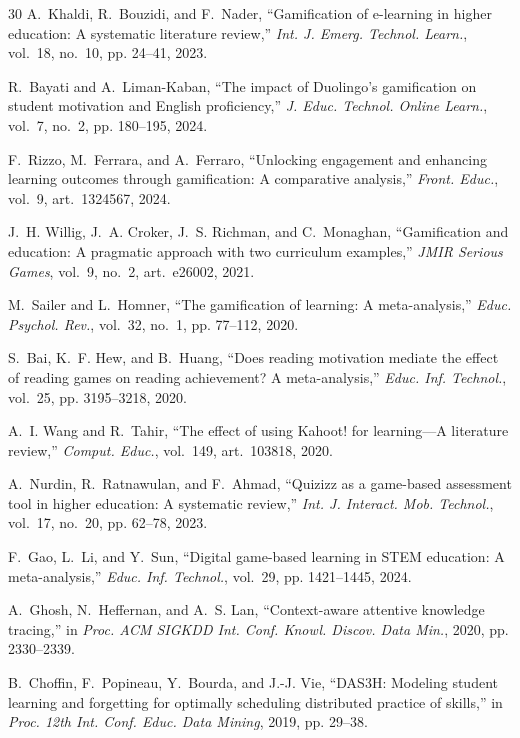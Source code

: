 \documentclass[journal]{IEEEtran}
\begin{document}

\begin{thebibliography}{30}
A.~Khaldi, R.~Bouzidi, and F.~Nader, ``Gamification of e-learning in higher education: A systematic literature review,'' \emph{Int. J. Emerg. Technol. Learn.}, vol.~18, no.~10, pp. 24--41, 2023.

R.~Bayati and A.~Liman-Kaban, ``The impact of Duolingo's gamification on student motivation and English proficiency,'' \emph{J. Educ. Technol. Online Learn.}, vol.~7, no.~2, pp. 180--195, 2024.

F.~Rizzo, M.~Ferrara, and A.~Ferraro, ``Unlocking engagement and enhancing learning outcomes through gamification: A comparative analysis,'' \emph{Front. Educ.}, vol.~9, art.~1324567, 2024.

J.~H. Willig, J.~A. Croker, J.~S. Richman, and C.~Monaghan, ``Gamification and education: A pragmatic approach with two curriculum examples,'' \emph{JMIR Serious Games}, vol.~9, no.~2, art.~e26002, 2021.

M.~Sailer and L.~Homner, ``The gamification of learning: A meta-analysis,'' \emph{Educ. Psychol. Rev.}, vol.~32, no.~1, pp. 77--112, 2020.

S.~Bai, K.~F. Hew, and B.~Huang, ``Does reading motivation mediate the effect of reading games on reading achievement? A meta-analysis,'' \emph{Educ. Inf. Technol.}, vol.~25, pp. 3195--3218, 2020.

A.~I. Wang and R.~Tahir, ``The effect of using Kahoot! for learning---A literature review,'' \emph{Comput. Educ.}, vol.~149, art.~103818, 2020.

A.~Nurdin, R.~Ratnawulan, and F.~Ahmad, ``Quizizz as a game-based assessment tool in higher education: A systematic review,'' \emph{Int. J. Interact. Mob. Technol.}, vol.~17, no.~20, pp. 62--78, 2023.

F.~Gao, L.~Li, and Y.~Sun, ``Digital game-based learning in STEM education: A meta-analysis,'' \emph{Educ. Inf. Technol.}, vol.~29, pp. 1421--1445, 2024.

A.~Ghosh, N.~Heffernan, and A.~S. Lan, ``Context-aware attentive knowledge tracing,'' in \emph{Proc. ACM SIGKDD Int. Conf. Knowl. Discov. Data Min.}, 2020, pp. 2330--2339.

B.~Choffin, F.~Popineau, Y.~Bourda, and J.-J. Vie, ``DAS3H: Modeling student learning and forgetting for optimally scheduling distributed practice of skills,'' in \emph{Proc. 12th Int. Conf. Educ. Data Mining}, 2019, pp. 29--38.


\end{thebibliography}
\end{document}
